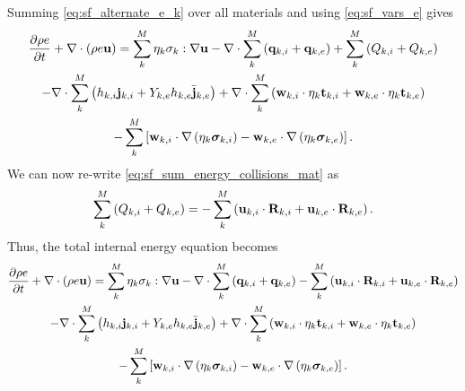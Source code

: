 \documentclass[a4paper,11pt]{report}
\begin{document}
Summing \cref{eq:sf_alternate_e_k} over all materials and using \cref{eq:sf_vars_e} gives
\begin{multline*}
    \frac{\partial \rho e}{\partial t} + \nabla \cdot \left( \rho e \mathbf{u} \right) = \sum_k^M \eta_k \sigma_k : \nabla \mathbf{u} - \nabla \cdot \sum_k^M \left( \mathbf{q}_{k,i} + \mathbf{q}_{k,e} \right) + \sum_k^M \left( Q_{k,i} + Q_{k,e} \right) \\
    - \nabla \cdot \sum_k^M \left( h_{k,i} \mathbf{j}_{k,i} + Y_{k,e} h_{k,e} \bar{\mathbf{j}}_{k,e} \right) + \nabla \cdot \sum_k^M \left( \mathbf{w}_{k,i} \cdot \eta_k \mathbf{t}_{k,i} + \mathbf{w}_{k,e} \cdot \eta_k \mathbf{t}_{k,e} \right) \\
    - \sum_k^M \left[ \mathbf{w}_{k,i} \cdot \nabla \left( \eta_k \bm \sigma_{k,i} \right) - \mathbf{w}_{k,e} \cdot \nabla \left( \eta_k \bm \sigma_{k,e} \right) \right].
\end{multline*}
We can now re-write \cref{eq:sf_sum_energy_collisions_mat} as 
\begin{equation}
    \sum_k^M \left( Q_{k,i} + Q_{k,e} \right) = -\sum_k^M \left( \mathbf{u}_{k,i} \cdot \mathbf{R}_{k,i} + \mathbf{u}_{k,e} \cdot \mathbf{R}_{k,e} \right).
\end{equation}
Thus, the total internal energy equation becomes
\begin{multline*}
    \frac{\partial \rho e}{\partial t} + \nabla \cdot \left( \rho e \mathbf{u} \right) = \sum_k^M \eta_k \sigma_k : \nabla \mathbf{u} - \nabla \cdot \sum_k^M \left( \mathbf{q}_{k,i} + \mathbf{q}_{k,e} \right) -\sum_k^M \left( \mathbf{u}_{k,i} \cdot \mathbf{R}_{k,i} + \mathbf{u}_{k,e} \cdot \mathbf{R}_{k,e} \right) \\
    - \nabla \cdot \sum_k^M \left( h_{k,i} \mathbf{j}_{k,i} + Y_{k,e} h_{k,e} \bar{\mathbf{j}}_{k,e} \right) + \nabla \cdot \sum_k^M \left( \mathbf{w}_{k,i} \cdot \eta_k \mathbf{t}_{k,i} + \mathbf{w}_{k,e} \cdot \eta_k \mathbf{t}_{k,e} \right) \\
    - \sum_k^M \left[ \mathbf{w}_{k,i} \cdot \nabla \left( \eta_k \bm \sigma_{k,i} \right) - \mathbf{w}_{k,e} \cdot \nabla \left( \eta_k \bm \sigma_{k,e} \right) \right].
\end{multline*}
\end{document}
